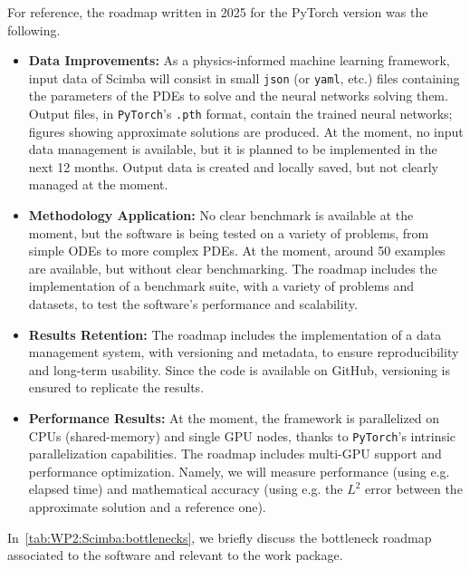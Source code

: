 For reference, the roadmap written in 2025 for the PyTorch version was the following.
\begin{itemize}
    \item \textbf{Data Improvements:} As a physics-informed machine learning framework, input data of Scimba will consist in small \texttt{json} (or \texttt{yaml}, etc.) files containing the parameters of the PDEs to solve and the neural networks solving them. Output files, in \texttt{PyTorch}'s \texttt{.pth} format, contain the trained neural networks; figures showing approximate solutions are produced. At the moment, no input data management is available, but it is planned to be implemented in the next 12 months. Output data is created and locally saved, but not clearly managed at the moment.
    \item \textbf{Methodology Application:} No clear benchmark is available at the moment, but the software is being tested on a variety of problems, from simple ODEs to more complex PDEs. At the moment, around 50 examples are available, but without clear benchmarking. The roadmap includes the implementation of a benchmark suite, with a variety of problems and datasets, to test the software's performance and scalability.
    \item \textbf{Results Retention:} The roadmap includes the implementation of a data management system, with versioning and metadata, to ensure reproducibility and long-term usability. Since the code is available on GitHub, versioning is ensured to replicate the results.
    \item \textbf{Performance Results:} At the moment, the framework is parallelized on CPUs (shared-memory) and single GPU nodes, thanks to \texttt{PyTorch}'s intrinsic parallelization capabilities.
          The roadmap includes multi-GPU support and performance optimization.
          Namely, we will measure performance (using e.g. elapsed time) and mathematical accuracy (using e.g. the $L^2$ error between the approximate solution and a reference one).
\end{itemize}

In~\cref{tab:WP2:Scimba:bottlenecks}, we briefly discuss the bottleneck roadmap associated to the software and relevant to the work package.

